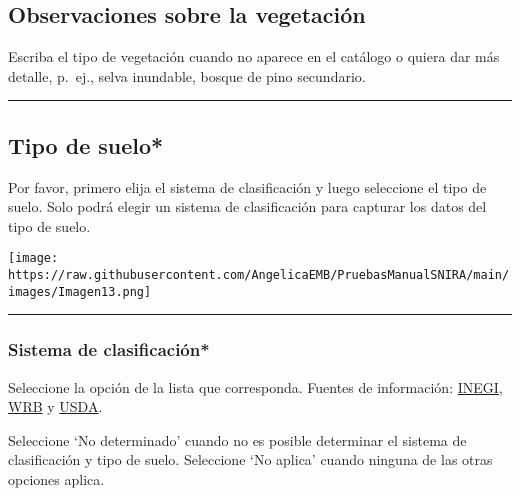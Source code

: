 \documentclass[
]{book}
\begin{document}
\hypertarget{observaciones-sobre-la-vegetaciuxf3n}{%
\subsection*{Observaciones sobre la vegetación}\label{observaciones-sobre-la-vegetaciuxf3n}}

Escriba el tipo de vegetación cuando no aparece en el catálogo o quiera dar más detalle, p.~ej., selva inundable, bosque de pino secundario.

\begin{center}\rule{0.5\linewidth}{0.5pt}\end{center}

\hypertarget{tipo-de-suelo}{%
\subsection*{\texorpdfstring{{Tipo de suelo*}}{Tipo de suelo*}}\label{tipo-de-suelo}}

Por favor, primero elija el sistema de clasificación y luego seleccione el tipo de suelo. Solo podrá elegir un sistema de clasificación para capturar los datos del tipo de suelo.

\texttt{[image: https://raw.githubusercontent.com/AngelicaEMB/PruebasManualSNIRA/main/images/Imagen13.png]}

\begin{center}\rule{0.5\linewidth}{0.5pt}\end{center}

\hypertarget{sistema-de-clasificaciuxf3n}{%
\subsubsection*{\texorpdfstring{{Sistema de clasificación*}}{Sistema de clasificación*}}\label{sistema-de-clasificaciuxf3n}}

Seleccione la opción de la lista que corresponda. Fuentes de información: \href{https://www.inegi.org.mx/temas/edafologia/}{INEGI}, \href{https://www.isric.org/explore/wrb\#:~:text=WRB\%20is\%20a\%20two\%2Dtier,expression\%20of\%20certain\%20soil\%20features.}{WRB} y \href{https://www.nrcs.usda.gov/resources/guides-and-instructions/soil-taxonomy}{USDA}.

Seleccione `No determinado' cuando no es posible determinar el sistema de clasificación y tipo de suelo.
Seleccione `No aplica' cuando ninguna de las otras opciones aplica.
\end{document}
